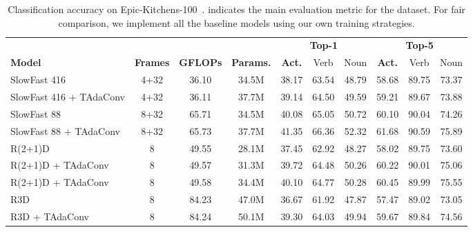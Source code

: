 \documentclass[10pt,journal,compsoc]{IEEEtran}
\newcommand{\tablestyle}[2]{\setlength{\tabcolsep}{#1}\renewcommand{\arraystretch}{#2}\centering\small}
\newcommand\graycell[0]{\cellcolor{midgrey}}
\def\x{}
\begin{document}
\begin{table*}[t]
\caption{Classification accuracy on Epic-Kitchens-100~\cite{ek100}.  indicates the main evaluation metric for the dataset. For fair comparison, we implement all the baseline models using our own training strategies.}
\centering
\tablestyle{3pt}{1.0}
\begin{tabular}{lccccccccc}
\toprule
~ & ~ & ~ & ~ & \multicolumn{3}{c}{\bf Top-1} & \multicolumn{3}{c}{\bf Top-5} \\
\cmidrule(r){5-7}\cmidrule(r){8-10}
\bf Model & \bf Frames & \bf GFLOPs & \bf Params.& \textbf{Act.} & Verb & Noun &\textbf{Act.} & Verb & Noun \\
\midrule
SlowFast 4\x16 & 4+32 & 36.10 & 34.5M & 38.17 & 63.54 & 48.79 & 58.68 & 89.75 & 73.37 \\
\graycell SlowFast 4\x16 + TAdaConv & \graycell4+32 & \graycell36.11 & \graycell37.7M & \graycell39.14 &\graycell 64.50 &\graycell 49.59 &\graycell 59.21 &\graycell 89.67 &\graycell 73.88 \\
\midrule
SlowFast 8\x8 & 8+32 & 65.71 & 34.5M & 40.08 & 65.05 & 50.72 & 60.10 & 90.04 & 74.26 \\ 
\graycell SlowFast 8\x8 + TAdaConv &\graycell 8+32 &\graycell 65.73 &\graycell 37.7M &\graycell 41.35 &\graycell 66.36 &\graycell 52.32 &\graycell 61.68 &\graycell 90.59 &\graycell 75.89 \\
\midrule
R(2+1)D & 8 & 49.55 & 28.1M & 37.45 & 62.92 & 48.27 & 58.02 & 89.75 & 73.60 \\
\graycell R(2+1)D + TAdaConv &\graycell 8 &\graycell 49.57 &\graycell 31.3M &\graycell 39.72 &\graycell 64.48 &\graycell 50.26 &\graycell 60.22 &\graycell 90.01 &\graycell 75.06\\
\graycell R(2+1)D + TAdaConv &\graycell 8 &\graycell 49.58 &\graycell 34.4M &\graycell 40.10 &\graycell 64.77 &\graycell 50.28 &\graycell 60.45 &\graycell 89.99 &\graycell 75.55\\
\midrule
R3D & 8 & 84.23 & 47.0M & 36.67 & 61.92 & 47.87 & 57.47 & 89.02 & 73.05 \\
\graycell R3D + TAdaConv &\graycell 8 &\graycell 84.24 &\graycell 50.1M &\graycell 39.30 &\graycell 64.03 &\graycell 49.94 &\graycell 59.67 &\graycell 89.84 &\graycell 74.56\\
\bottomrule
\end{tabular}
\label{tab:pluginevalepickitchen}
\end{table*}
\newcommand{\hacs}[1]{\multirow{3}{*}{#1}}
\end{document}
